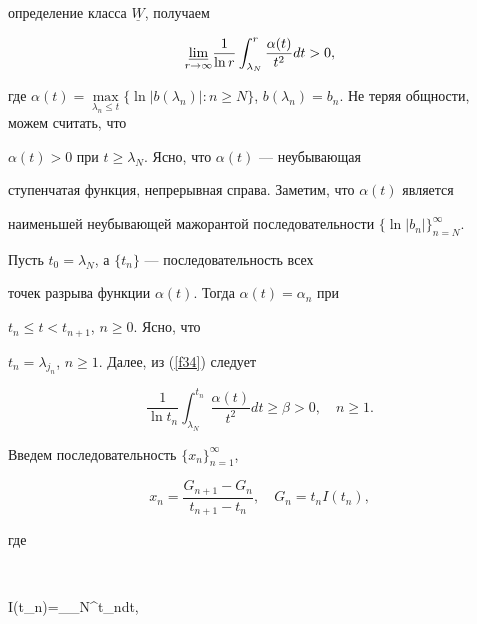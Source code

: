 определение класса $\underline W$, получаем


\begin{equation}\label{f34}


\underset{r\to\infty}{\varliminf}{}


\frac{1}{\ln r}\int_{\lambda_{N}}^{r}\frac{\alpha(t)}{t^{2}}dt>0,


\end{equation}


где $\alpha(t)=\max\limits_{\lambda_{n}\leq t}\{\ln|b(\lambda_{n})|:n\geq


N\}$, $b(\lambda_{n})=b_{n}$. Не теряя общности, можем считать, что


$\alpha(t)>0$ при $t\ge\lambda_{N}$. Ясно, что $\alpha(t)$ --- неубывающая


ступенчатая функция, непрерывная справа. Заметим, что $\alpha(t)$ является


наименьшей неубывающей мажорантой последовательности $\{\ln


|b_{n}|\}_{n=N}^{\infty}$.





Пусть $t_{0}=\lambda_{N}$, а $\{t_{n}\}$ --- последовательность всех


точек разрыва функции $\alpha(t)$. Тогда $\alpha(t)=\alpha_{n}$ при


$t_{n}\leq t<t_{n+1}$, $n\geq 0$. Ясно, что


$t_{n}=\lambda_{j_{n}}$, $n\geq 1$. Далее, из (\ref{f34}) следует


\begin{equation}\label{f35}


\frac{1}{\ln t_{n}}\int_{\lambda_{N}}^{t_{n}}


\frac{\alpha(t)}{t^{2}}dt\geq\beta>0,


\quad n\geq 1.


\end{equation}





Введем последовательность $\{x_{n}\}_{n=1}^{\infty}$,


$$


x_{n}=\frac{G_{n+1}-G_{n}}{t_{n+1}-t_{n}},\quad G_{n}=t_{n}I(t_{n}),


$$


где


$$


I(t_{n})=\int_{\lambda_{N}}^{t_{n}}dt,\quad


